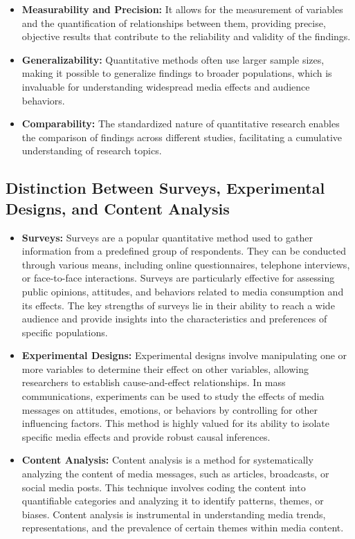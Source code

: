 \documentclass[
]{book}
\begin{document}
\begin{itemize}
\item
  \textbf{Measurability and Precision:} It allows for the measurement of variables and the quantification of relationships between them, providing precise, objective results that contribute to the reliability and validity of the findings.
\item
  \textbf{Generalizability:} Quantitative methods often use larger sample sizes, making it possible to generalize findings to broader populations, which is invaluable for understanding widespread media effects and audience behaviors.
\item
  \textbf{Comparability:} The standardized nature of quantitative research enables the comparison of findings across different studies, facilitating a cumulative understanding of research topics.
\end{itemize}

\hypertarget{distinction-between-surveys-experimental-designs-and-content-analysis}{%
\subsection*{Distinction Between Surveys, Experimental Designs, and Content Analysis}\label{distinction-between-surveys-experimental-designs-and-content-analysis}}

\begin{itemize}
\item
  \textbf{Surveys:} Surveys are a popular quantitative method used to gather information from a predefined group of respondents. They can be conducted through various means, including online questionnaires, telephone interviews, or face-to-face interactions. Surveys are particularly effective for assessing public opinions, attitudes, and behaviors related to media consumption and its effects. The key strengths of surveys lie in their ability to reach a wide audience and provide insights into the characteristics and preferences of specific populations.
\item
  \textbf{Experimental Designs:} Experimental designs involve manipulating one or more variables to determine their effect on other variables, allowing researchers to establish cause-and-effect relationships. In mass communications, experiments can be used to study the effects of media messages on attitudes, emotions, or behaviors by controlling for other influencing factors. This method is highly valued for its ability to isolate specific media effects and provide robust causal inferences.
\item
  \textbf{Content Analysis:} Content analysis is a method for systematically analyzing the content of media messages, such as articles, broadcasts, or social media posts. This technique involves coding the content into quantifiable categories and analyzing it to identify patterns, themes, or biases. Content analysis is instrumental in understanding media trends, representations, and the prevalence of certain themes within media content.
\end{itemize}
\end{document}
